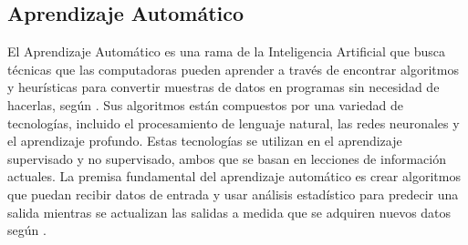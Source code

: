 \subsection{Aprendizaje Automático}
El Aprendizaje Automático es una rama de la Inteligencia Artificial que busca técnicas que las computadoras pueden aprender a través de encontrar algoritmos y heurísticas para convertir muestras de datos en programas sin necesidad de hacerlas, según \parencite{bk_russell2009intart}. Sus algoritmos están compuestos por una variedad de tecnologías, incluido el procesamiento de lenguaje natural, las redes neuronales y el aprendizaje profundo. Estas tecnologías se utilizan en el aprendizaje supervisado y no supervisado, ambos que se basan en lecciones de información actuales. La premisa fundamental del aprendizaje automático es crear algoritmos que puedan recibir datos de entrada y usar análisis estadístico para predecir una salida mientras se actualizan las salidas a medida que se adquiren nuevos datos según \parencite{bk_alpaydin2014ml}.


